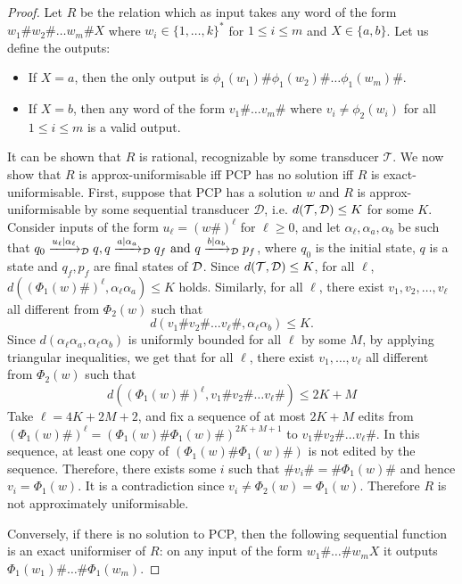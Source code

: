 \documentclass[a4paper,UKenglish,cleveref, autoref, thm-restate,authorcolumns, colorlinks]{lipics-v2021}
\newcommand\calT{\mathcal{T}}
\newcommand{\trans}{\mathcal{T}}
\begin{document}
{\begin{proof}
Let $R$ be the relation which as input takes any word of the form $w_1\#w_2\#\dots w_m\#X$
where $w_i\in \{1,\dots,k\}^*$ for $1\leq i\leq m$ and $X\in\{a,b\}$. Let us define the outputs:
\begin{itemize}
\item If $X = a$, then the only output is $\phi_1(w_1)\#\phi_1(w_2)\#\dots \phi_1(w_m)\#$.
\item If $X = b$, then any word of the form 
$v_1\#\dots v_m\#\text{ where } v_i\neq \phi_2(w_i)$ for all $1\leq i\leq m$ is a valid output.
\end{itemize}
It can be shown that $R$ is rational, recognizable by some transducer $\calT$.
We now show that $R$ is approx-uniformisable iff PCP has no solution iff $R$ is exact-uniformisable. First, suppose that PCP has a solution $w$ and $R$ is approx-uniformisable by some
sequential transducer $\mathcal{D}$, i.e. $d(\trans,{\cal D})\leq K$
for some $K$. Consider inputs of the form $u_{\ell} = (w\#)^\ell$ for
$\ell\geq 0$, and let $\alpha_\ell,\alpha_a,\alpha_b$ be such that $q_0\xrightarrow{u_\ell|\alpha_\ell}_{\cal D} q,
q\xrightarrow{a\mid \alpha_a}_{\cal D} q_f\text{ and } q\xrightarrow{b\mid
  \alpha_b}_{\cal D} p_f$, 
where $q_0$ is the initial state, $q$ is a state and $q_f,p_f$ are
final states of ${\cal D}$. Since $d(\trans,{\cal D})\leq K$, for all $\ell$,
$d((\Phi_1(w)\#)^\ell, \alpha_\ell\alpha_a)\leq K$ holds.
Similarly, for all $\ell$, there exist $v_1,v_2,\dots,v_\ell$ all different from $\Phi_2(w)$ such that
$$d(v_1\#v_2\#\dots v_\ell\#, \alpha_\ell\alpha_b)\leq K.$$
Since $d(\alpha_\ell\alpha_a,\alpha_\ell\alpha_b)$ is uniformly bounded for all $\ell$ by some $M$, by applying triangular
inequalities, we get that for all $\ell$, there exist $v_1,\dots,v_\ell$ all different from $\Phi_2(w)$ such that
$$
d((\Phi_1(w)\#)^{\ell}, v_1\#v_2\#\dots v_\ell\#)\leq 2K+M
$$
Take $\ell = 4K+2M+2$, and fix a sequence of at most $2K+M$ edits from
\\$(\Phi_1(w)\#)^{\ell} = (\Phi_1(w)\#\Phi_1(w)\#)^{2K+M+1}$ to
$v_1\#v_2\#\dots v_\ell\#$. In this sequence, at least one copy of
$(\Phi_1(w)\#\Phi_1(w)\#)$ is not edited by the sequence. Therefore, 
there exists some $i$ such that $\#v_i\# = \#\Phi_1(w)\#$ and hence $v_i = \Phi_1(w)$. It is a contradiction since $v_i\neq \Phi_2(w) = \Phi_1(w)$. Therefore $R$ is not approximately uniformisable. 


Conversely, if there is no solution to PCP, then the following
sequential function is an exact uniformiser of $R$: on any input of
the form $w_1\#\dots \# w_mX$ it outputs $\Phi_1(w_1)\#\dots \#\Phi_1(w_m)$.\qedhere
\end{proof}

}
\end{document}
